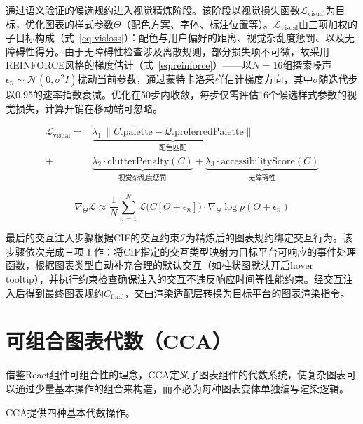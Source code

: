 通过语义验证的候选规约进入视觉精炼阶段。该阶段以视觉损失函数$\mathcal{L}_{\text{visual}}$为目标，优化图表的样式参数$\Theta$（配色方案、字体、标注位置等）。$\mathcal{L}_{\text{visual}}$由三项加权的子目标构成（式~\ref{eq:visloss}）：配色与用户偏好的距离、视觉杂乱度惩罚、以及无障碍性得分。由于无障碍性检查涉及离散规则，部分损失项不可微，故采用REINFORCE风格的梯度估计（式~\ref{eq:reinforce}）——以$N=16$组探索噪声$\epsilon_n \sim \mathcal{N}(0, \sigma^2 I)$扰动当前参数，通过蒙特卡洛采样估计梯度方向，其中$\sigma$随迭代步以0.95的速率指数衰减。优化在50步内收敛，每步仅需评估16个候选样式参数的视觉损失，计算开销在移动端可忽略。

\begin{equation}\label{eq:visloss}
    \begin{aligned}
    \mathcal{L}_{\text{visual}} =
        & \underbrace{\lambda_1\, \|C.\text{palette} - \mathcal{Q}.\text{preferredPalette}\|}_{\text{配色匹配}} \\
        + & \underbrace{\lambda_2 \cdot \text{clutterPenalty}(C)}_{\text{视觉杂乱度惩罚}}
        + \underbrace{\lambda_3 \cdot \text{accessibilityScore}(C)}_{\text{无障碍性}}
    \end{aligned}
\end{equation}

\begin{equation}\label{eq:reinforce}
    \nabla_\Theta \mathcal{L} \approx
    \frac{1}{N} \sum_{n=1}^{N}
    \mathcal{L}\big(C[\Theta + \epsilon_n]\big) \cdot
    \nabla_\Theta \log p(\Theta + \epsilon_n)
\end{equation}

最后的交互注入步骤根据CIF的交互约束$\mathcal{I}$为精炼后的图表规约绑定交互行为。该步骤依次完成三项工作：将CIF指定的交互类型映射为目标平台可响应的事件处理函数，根据图表类型自动补充合理的默认交互（如柱状图默认开启hover tooltip），并执行约束检查确保注入的交互不违反响应时间等性能约束。经交互注入后得到最终图表规约$C_{\text{final}}$，交由渲染适配层转换为目标平台的图表渲染指令。

\section{可组合图表代数（CCA）}
\label{sec:cca}

借鉴React组件可组合性的理念，CCA定义了图表组件的代数系统，使复杂图表可以通过少量基本操作的组合来构造，而不必为每种图表变体单独编写渲染逻辑。

CCA提供四种基本代数操作。

